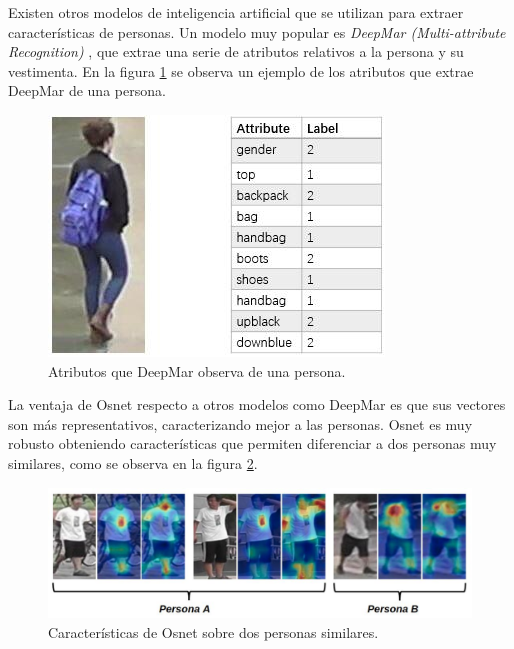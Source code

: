 
\newpage

Existen otros modelos de inteligencia artificial que se utilizan para extraer características de personas. Un modelo muy popular es \textit{DeepMar (Multi-attribute Recognition)} \citep{DEEPMAR}, que extrae una serie de atributos relativos a la persona y su vestimenta. En la figura \ref{fig:deepmar} se observa un ejemplo de los atributos que extrae DeepMar de una persona.

\begin{figure}[ht]
	\centering
	\includegraphics[scale=.8]{./Figures/deepmar.png}
	\caption{Atributos que DeepMar observa de una persona\protect\footnotemark.}
	\label{fig:deepmar}
\end{figure}


La ventaja de Osnet respecto a otros modelos como DeepMar es que sus vectores son más representativos, caracterizando mejor a las personas. Osnet es muy robusto obteniendo características que permiten diferenciar a dos personas muy similares, como se observa en la figura \ref{fig:osnetDosPersonas}.

\begin{figure}[ht]
	\centering
	\includegraphics[scale=0.5]{./Figures/osnetDosPersonas.jpg}
	\caption{Características de Osnet sobre dos personas similares\protect\footnotemark.}
	\label{fig:osnetDosPersonas}
\end{figure}

